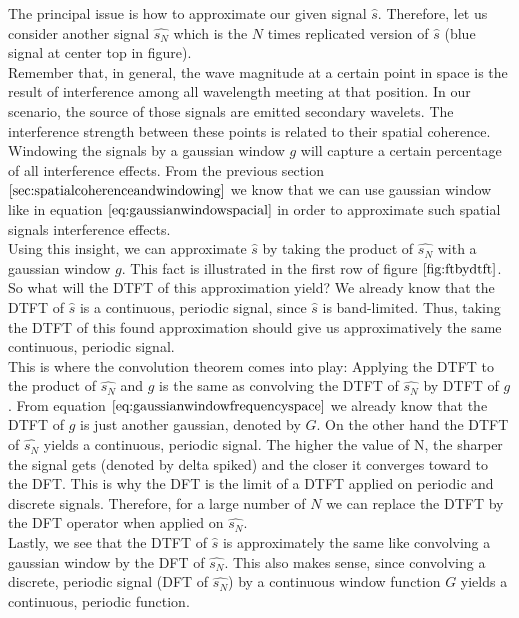 The principal issue is how to approximate our given signal $\hat{s}$. Therefore, let us consider another signal $\hat{s_N}$ which is the $N$ times replicated version of $\hat{s}$ (blue signal at center top in figure). \\

Remember that, in general, the wave magnitude at a certain point in space is the result of interference among all wavelength meeting at that position. In our scenario, the source of those signals are emitted secondary wavelets. The interference strength between these points is related to their spatial coherence. Windowing the signals by a gaussian window $g$ will capture a certain percentage of all interference effects. From the previous section $\ref{sec:spatialcoherenceandwindowing}$ we know that we can use gaussian window like in equation $\ref{eq:gaussianwindowspacial}$ in order to approximate such spatial signals interference effects. \\

Using this insight, we can approximate $\hat{s}$ by taking the product of $\hat{s_N}$ with a gaussian window $g$. This fact is illustrated in the first row of figure $\ref{fig:ftbydtft}$. So what will the DTFT of this approximation yield? We already know that the DTFT of $\hat{s}$ is a continuous, periodic signal, since $\hat{s}$ is band-limited. Thus, taking the DTFT of this found approximation should give us approximatively the same continuous, periodic signal. \\

This is where the convolution theorem comes into play: Applying the DTFT to the product of $\hat{s_N}$ and $g$ is the same as convolving the DTFT of $\hat{s_N}$ by DTFT of $g$. From equation $\ref{eq:gaussianwindowfrequencyspace}$ we already know that the DTFT of $g$ is just another gaussian, denoted by $G$. On the other hand the DTFT of $\hat{s_N}$ yields a continuous, periodic signal. The higher the value of N, the sharper the signal gets (denoted by delta spiked) and the closer it converges toward to the DFT. This is why the DFT is the limit of a DTFT applied on periodic and discrete signals. Therefore, for a large number of $N$ we can replace the DTFT by the DFT operator when applied on $\hat{s_N}$. \\

Lastly, we see that the DTFT of $\hat{s}$ is approximately the same like convolving a gaussian window by the DFT of $\hat{s_N}$. This also makes sense, since convolving a discrete, periodic signal (DFT of $\hat{s_N}$) by a continuous window function $G$ yields a continuous, periodic function. \\


